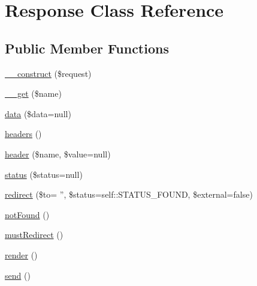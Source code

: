\hypertarget{classResponse}{
\section{Response Class Reference}
\label{classResponse}
}
\subsection*{Public Member Functions}
\begin{DoxyCompactItemize}
\item 
\hyperlink{classResponse_a0b56fd29658dadcf8b08be1912a59c0e}{\_\-\_\-construct} (\$request)
\item 
\hyperlink{classResponse_a784441c53f2d035af9cf8736006aa914}{\_\-\_\-get} (\$name)
\item 
\hyperlink{classResponse_ac4311e7d9dcec3bcdb0d55807303e7c1}{data} (\$data=null)
\item 
\hyperlink{classResponse_a007132b026abc70f7085d153c2359969}{headers} ()
\item 
\hyperlink{classResponse_ae29e05652ee532c0e1fe33f1ea91b679}{header} (\$name, \$value=null)
\item 
\hyperlink{classResponse_a460f7b14f031e70ed1ffbca4bec028ea}{status} (\$status=null)
\item 
\hyperlink{classResponse_afa76219fd90ae30785f00b778102ca52}{redirect} (\$to= '', \$status=self::STATUS\_\-FOUND, \$external=false)
\item 
\hyperlink{classResponse_a7405847fb8cf98fc32191a36432a2f3b}{notFound} ()
\item 
\hyperlink{classResponse_aa3a0fd660c5a74ffeaa5f8e12afab33a}{mustRedirect} ()
\item 
\hyperlink{classResponse_adf7a61aa1ae41f75089f533ca55ff4c9}{render} ()
\item 
\hyperlink{classResponse_aabb13e0b1701b8ffad0087e036359d2c}{send} ()
\end{DoxyCompactItemize}
